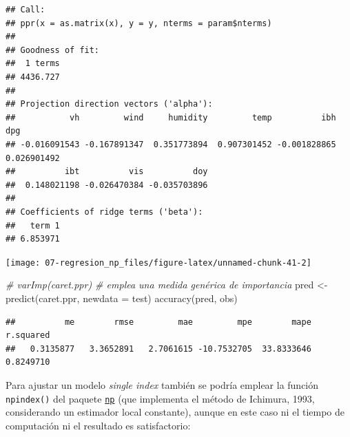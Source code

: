 \documentclass[
]{book}
\newenvironment{Shaded}{\begin{snugshade}}{\end{snugshade}}
\newcommand{\AttributeTok}[1]{\textcolor[rgb]{0.77,0.63,0.00}{#1}}
\newcommand{\CommentTok}[1]{\textcolor[rgb]{0.56,0.35,0.01}{\textit{#1}}}
\newcommand{\FunctionTok}[1]{\textcolor[rgb]{0.00,0.00,0.00}{#1}}
\newcommand{\NormalTok}[1]{#1}
\newcommand{\OtherTok}[1]{\textcolor[rgb]{0.56,0.35,0.01}{#1}}
\newcommand{\SpecialCharTok}[1]{\textcolor[rgb]{0.00,0.00,0.00}{#1}}
\theoremstyle{break}
\theoremstyle{definition}
\theoremstyle{definition}
\theoremstyle{definition}
\theoremstyle{definition}
\theoremstyle{remark}
\begin{document}
\begin{Shaded}
\end{Shaded}

\begin{verbatim}
## Call:
## ppr(x = as.matrix(x), y = y, nterms = param$nterms)
## 
## Goodness of fit:
##  1 terms 
## 4436.727 
## 
## Projection direction vectors ('alpha'):
##           vh         wind     humidity         temp          ibh          dpg 
## -0.016091543 -0.167891347  0.351773894  0.907301452 -0.001828865  0.026901492 
##          ibt          vis          doy 
##  0.148021198 -0.026470384 -0.035703896 
## 
## Coefficients of ridge terms ('beta'):
##   term 1 
## 6.853971
\end{verbatim}

\begin{Shaded}
\end{Shaded}

\begin{center}\texttt{[image: 07-regresion\_np\_files/figure-latex/unnamed-chunk-41-2]} \end{center}

\begin{Shaded}
\begin{Highlighting}[]
\CommentTok{\# varImp(caret.ppr) \# emplea una medida genérica de importancia}
\NormalTok{pred }\OtherTok{\textless{}{-}} \FunctionTok{predict}\NormalTok{(caret.ppr, }\AttributeTok{newdata =}\NormalTok{ test)}
\FunctionTok{accuracy}\NormalTok{(pred, obs)}
\end{Highlighting}
\end{Shaded}

\begin{verbatim}
##          me        rmse         mae         mpe        mape   r.squared 
##   0.3135877   3.3652891   2.7061615 -10.7532705  33.8333646   0.8249710
\end{verbatim}

Para ajustar un modelo \emph{single index} también se podría emplear la función \texttt{npindex()} del paquete \href{https://github.com/JeffreyRacine/R-Package-np}{\texttt{np}} (que implementa el método de Ichimura, 1993, considerando un estimador local constante), aunque en este caso ni el tiempo de computación ni el resultado es satisfactorio:
\end{document}
